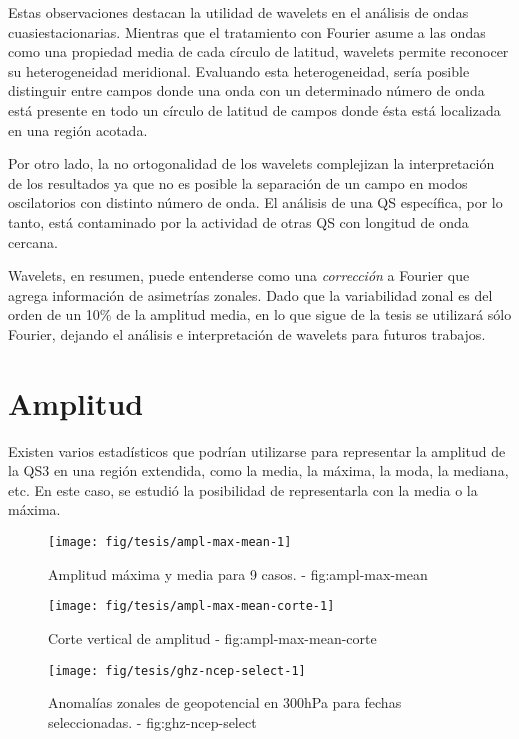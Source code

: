 \documentclass[spanish,a4paper,12p]{book}
\begin{document}
Estas observaciones destacan la utilidad de wavelets en el análisis de
ondas cuasiestacionarias. Mientras que el tratamiento con Fourier asume
a las ondas como una propiedad media de cada círculo de latitud,
wavelets permite reconocer su heterogeneidad meridional. Evaluando esta
heterogeneidad, sería posible distinguir entre campos donde una onda con
un determinado número de onda está presente en todo un círculo de
latitud de campos donde ésta está localizada en una región acotada.

Por otro lado, la no ortogonalidad de los wavelets complejizan la
interpretación de los resultados ya que no es posible la separación de
un campo en modos oscilatorios con distinto número de onda. El análisis
de una QS específica, por lo tanto, está contaminado por la actividad de
otras QS con longitud de onda cercana.

Wavelets, en resumen, puede entenderse como una \emph{corrección} a
Fourier que agrega información de asimetrías zonales. Dado que la
variabilidad zonal es del orden de un 10\% de la amplitud media, en lo
que sigue de la tesis se utilizará sólo Fourier, dejando el análisis e
interpretación de wavelets para futuros trabajos.

\section{Amplitud}\label{amplitud}

Existen varios estadísticos que podrían utilizarse para representar la
amplitud de la QS3 en una región extendida, como la media, la máxima, la
moda, la mediana, etc. En este caso, se estudió la posibilidad de
representarla con la media o la máxima.

\begin{figure*}
\texttt{[image: fig/tesis/ampl-max-mean-1]} \caption{Amplitud máxima y media para 9 casos. - fig:ampl-max-mean}\label{fig:ampl-max-mean}
\end{figure*}

\begin{figure*}
\texttt{[image: fig/tesis/ampl-max-mean-corte-1]} \caption{Corte vertical de amplitud - fig:ampl-max-mean-corte}\label{fig:ampl-max-mean-corte}
\end{figure*}

\begin{figure*}
\texttt{[image: fig/tesis/ghz-ncep-select-1]} \caption{Anomalías zonales de geopotencial en 300hPa para fechas seleccionadas. - fig:ghz-ncep-select}\label{fig:ghz-ncep-select}
\end{figure*}
\end{document}
